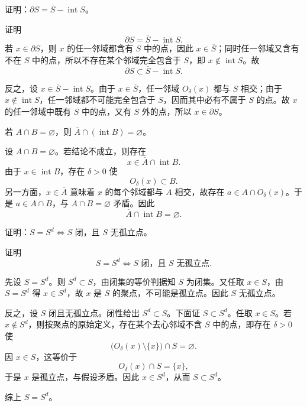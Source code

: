 \begin{xexercise}[2]
证明：$\partial S=\overline S-\operatorname{int}S$。
\end{xexercise}
\begin{xsolution}
证明
\[
  \partial S=\overline S-\operatorname{int}S.
\]
若 $x\in\partial S$，则 $x$ 的任一邻域都含有 $S$ 中的点，因此 $x\in\overline S$；同时任一邻域又含有不在 $S$ 中的点，所以不存在某个邻域完全包含于 $S$，即 $x\notin\operatorname{int}S$。故
\[
  \partial S\subset\overline S-\operatorname{int}S.
\]

反之，设 $x\in\overline S-\operatorname{int}S$。由于 $x\in\overline S$，任一邻域 $O_\delta(x)$ 都与 $S$ 相交；由于 $x\notin\operatorname{int}S$，任一邻域都不可能完全包含于 $S$，因而其中必有不属于 $S$ 的点。故 $x$ 的任一邻域中既有 $S$ 中的点，又有 $S$ 外的点，所以 $x\in\partial S$。
\end{xsolution}


\begin{xexercise}[3]
若 $A\cap B=\varnothing$，则 $\overline A\cap(\operatorname{int}B)=\varnothing$。
\end{xexercise}
\begin{xsolution}
设 $A\cap B=\varnothing$。若结论不成立，则存在
\[
  x\in\overline A\cap\operatorname{int}B.
\]
由于 $x\in\operatorname{int}B$，存在 $\delta>0$ 使
\[
  O_\delta(x)\subset B.
\]
另一方面，$x\in\overline A$ 意味着 $x$ 的每个邻域都与 $A$ 相交，故存在 $a\in A\cap O_\delta(x)$。于是 $a\in A\cap B$，与 $A\cap B=\varnothing$ 矛盾。因此
\[
  \overline A\cap\operatorname{int}B=\varnothing.
\]
\end{xsolution}


\begin{xexercise}[4]
证明：$S=S^d\Longleftrightarrow S$ 闭，且 $S$ 无孤立点。
\end{xexercise}
\begin{xsolution}
证明
\[
  S=S^d\Longleftrightarrow S\text{ 闭，且 }S\text{ 无孤立点}.
\]

先设 $S=S^d$。则 $S^d\subset S$，由闭集的等价判据知 $S$ 为闭集。又任取 $x\in S$，由 $S=S^d$ 得 $x\in S^d$，故 $x$ 是 $S$ 的聚点，不可能是孤立点。因此 $S$ 无孤立点。

反之，设 $S$ 闭且无孤立点。闭性给出 $S^d\subset S$。下面证 $S\subset S^d$。任取 $x\in S$。若 $x\notin S^d$，则按聚点的原始定义，存在某个去心邻域不含 $S$ 中的点，即存在 $\delta>0$ 使
\[
  \bigl(O_\delta(x)\setminus\{x\}\bigr)\cap S=\varnothing.
\]
因 $x\in S$，这等价于
\[
  O_\delta(x)\cap S=\{x\},
\]
于是 $x$ 是孤立点，与假设矛盾。因此 $x\in S^d$，从而 $S\subset S^d$。

综上 $S=S^d$。
\end{xsolution}


